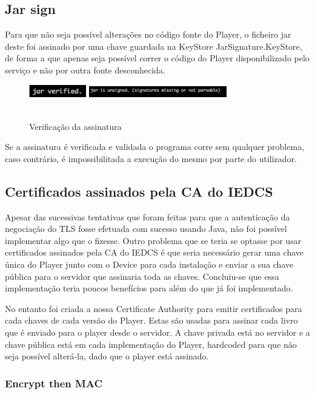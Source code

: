 \documentclass[pdftex,12pt,a4paper]{report}
\begin{document}
\subsection{Jar sign}
Para que não seja possível alterações no código fonte do  Player, o ficheiro jar deste foi assinado por uma chave guardada na KeyStore JarSignature.KeyStore, de forma a que apenas seja possível correr o código do Player disponibilizado pelo serviço e não por outra fonte desconhecida.

\begin{figure}[!htb]
\center
 \includegraphics[width=25mm,scale=1]{jarsigned.png}
 \includegraphics[width=60mm,scale=1]{jarunsigned.png}
 \caption{\\Verificação da assinatura}
 \label{fig:docker_c}
\end{figure}

Se a assinatura é verificada e validada o programa corre sem qualquer problema, caso contrário, é impossibilitada a execução do mesmo por parte do utilizador.

\subsection{Certificados assinados pela CA do IEDCS}
Apesar das sucessivas tentativas que foram feitas para que a autenticação da negociação do TLS fosse efetuada com sucesso usando Java, não foi possível implementar algo que o fizesse. Outro problema que se teria se optasse por usar certificados assinados pela CA do IEDCS é que seria necessário gerar uma chave única do Player junto com o Device para cada instalação e enviar a sua chave pública para o servidor que assinaria toda as chaves. Concluiu-se  que essa implementação teria poucos benefícios para além do que já foi implementado.

No entanto foi criada a nossa Certificate Authority para emitir certificados para cada chaves de cada versão do Player. Estas são usadas para assinar cada livro que é enviado para o player desde o servidor. A chave privada está no servidor e a chave pública está em cada implementação do Player, hardcoded para que não seja possível alterá-la, dado que o player está assinado.

\subsubsection{Encrypt then MAC}
\end{document}
